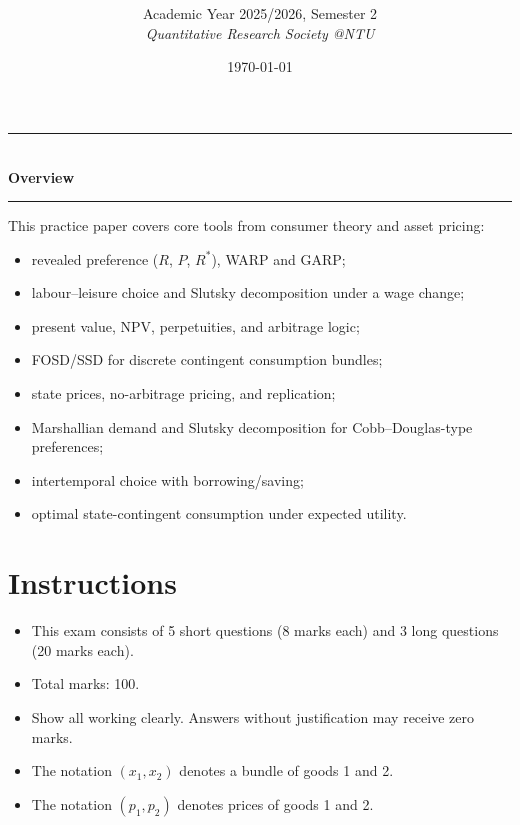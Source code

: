 \documentclass[12pt]{article}
\title{
\CourseCode \CourseName \\[0.3em]
\large \DocType
}
\author{
  Academic Year 2025/2026, Semester 2 \\[0.25em]
  \textit{Quantitative Research Society @NTU}
}
\date{\today}
\begin{document}
\maketitle
\thispagestyle{plainfirst}
\pagestyle{main}
\bigskip

\begin{center}
  \rule{0.8\textwidth}{0.4pt}\\[4pt]
  \textbf{Overview}\\[2pt]
  \rule{0.8\textwidth}{0.4pt}
\end{center}

\noindent
This practice paper covers core tools from consumer theory and asset pricing:
\begin{itemize}[leftmargin=*]
  \item revealed preference ($R$, $P$, $R^*$), WARP and GARP;
  \item labour--leisure choice and Slutsky decomposition under a wage change;
  \item present value, NPV, perpetuities, and arbitrage logic;
  \item FOSD/SSD for discrete contingent consumption bundles;
  \item state prices, no-arbitrage pricing, and replication;
  \item Marshallian demand and Slutsky decomposition for Cobb--Douglas-type preferences;
  \item intertemporal choice with borrowing/saving;
  \item optimal state-contingent consumption under expected utility.
\end{itemize}

\section*{Instructions}
\begin{itemize}
\item This exam consists of 5 short questions (8 marks each) and 3 long questions (20 marks each).
\item Total marks: 100.
\item Show all working clearly. Answers without justification may receive zero marks.
\item The notation $(x_1, x_2)$ denotes a bundle of goods 1 and 2.
\item The notation $(p_1, p_2)$ denotes prices of goods 1 and 2.
\end{itemize}
\end{document}
